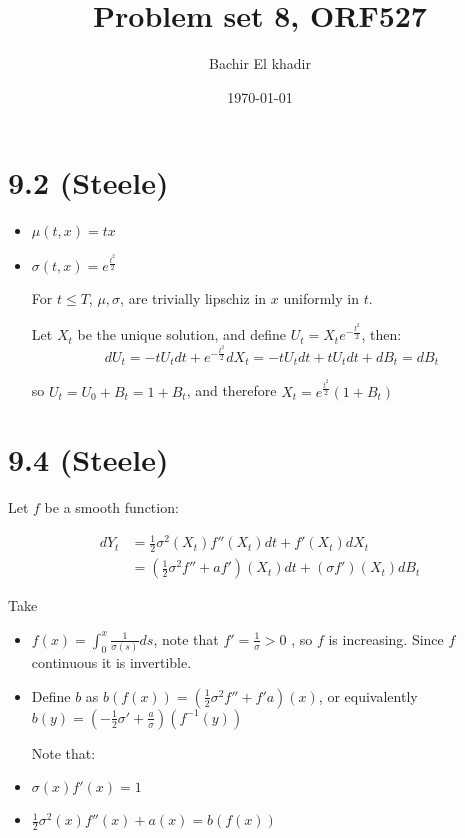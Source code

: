 \documentclass[11pt]{article}
\author{Bachir El khadir}
\date{\today}
\title{Problem set 8, ORF527}
\begin{document}
\maketitle

\section{9.2 (Steele)}
\label{sec:orgheadline1}

\begin{itemize}
\item \(\mu(t, x) = tx\)
\item \(\sigma(t, x) = e^{\frac{t^2}2}\)

For \(t \le T\), \(\mu, \sigma\), are trivially lipschiz in \(x\) uniformly in \(t\).

Let \(X_t\) be the unique solution, and define \(U_t = X_te^{-\frac{t^2}2}\), then:
$$dU_t = -tU_t dt + e^{-\frac{t^2}2} dX_t = -tU_tdt + tU_tdt + dB_t = dB_t$$

so \(U_t = U_0 + B_t = 1 + B_t\), and therefore \(X_t = e^{\frac{t^2}2}(1+B_t)\)
\end{itemize}

\section{9.4 (Steele)}
\label{sec:orgheadline2}

Let \(f\) be a smooth function:

\begin{align*}
dY_t &= \frac12 \sigma^2(X_t) f''(X_t)dt + f'(X_t) dX_t
\\&= (\frac12 \sigma^2 f'' + af')(X_t) dt + (\sigma f')(X_t) dB_t
\end{align*}

Take
\begin{itemize}
\item \(f(x) = \int_0^x \frac1{\sigma(s)} ds\), note that \(f' = \frac1{\sigma} > 0\) , so \(f\) is increasing. Since \(f\) continuous it is invertible.
\item Define \(b\) as \(b(f(x)) = (\frac12 \sigma^2f'' + f'a)(x)\), or equivalently \(b(y) = (- \frac12 \sigma' + \frac a{\sigma})(f^{-1}(y))\)

Note that:

\item \(\sigma(x) f'(x) = 1\)
\item \(\frac12 \sigma^2(x) f''(x) + a(x) =  b(f(x))\)
\end{itemize}
\end{document}
